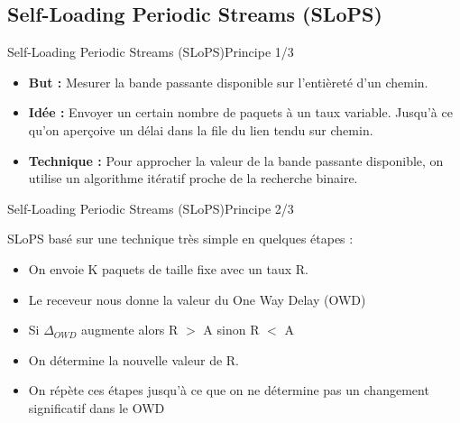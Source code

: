 \documentclass[compress]{beamer}
\begin{document}
\subsection{Self-Loading Periodic Streams (SLoPS)}
\begin{frame}{Self-Loading Periodic Streams (SLoPS)}{Principe 1/3}
\begin{itemize}
\item \textbf{But :}  Mesurer la {\color{red}bande passante disponible} sur l'entièreté d'un chemin.
\pause
\item \textbf{Idée :}  Envoyer un certain nombre de paquets à un taux variable. Jusqu'à ce qu'on aperçoive un délai dans la file du lien tendu sur chemin.
\pause
\item \textbf{Technique :} Pour approcher la valeur de la bande passante
disponible, on utilise un algorithme itératif proche de la recherche binaire.
\end{itemize}
\end{frame}
\begin{frame}{Self-Loading Periodic Streams (SLoPS)}{Principe 2/3}

SLoPS basé sur une technique très simple en quelques étapes :
\begin{itemize}
\item On envoie K paquets de taille fixe avec un taux R.
\pause
\item Le receveur nous donne la valeur du One Way Delay (OWD)
\item Si $\Delta_{OWD}$ augmente alors R $>$ A sinon R $<$ A
\pause
\item On détermine la nouvelle valeur de R.
\item On répète ces étapes jusqu'à ce que on ne détermine pas un changement significatif dans le OWD
\end{itemize}
\end{frame}
\end{document}
